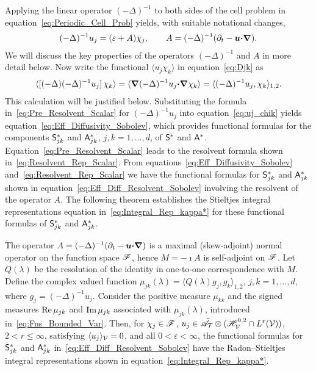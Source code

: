 \documentclass[amsa]{ipart}
\begin{document}
Applying the linear operator $(-\Delta)^{-1}$ to both sides of the cell
problem in equation~\eqref{eq:Periodic_Cell_Prob} yields, with
suitable notational changes,
%
\begin{align}\label{eq:Pre_Resolvent_Scalar}
  (-\Delta)^{-1}u_j=(\varepsilon+A)\chi_j,
  \qquad
  A=(-\Delta)^{-1}(\partial_t-\vecu \bcdot\bnabla).
\end{align}
%
We will discuss the key properties of the operators $(-\Delta)^{-1}$ and
$A$ in more detail below.  Now write the functional $\langle u_j\chi_k\rangle$ in 
equation~\eqref{eq:Djk} as~\cite{Pavliotis:PHD_Thesis}       
%
\begin{align}\label{eq:uj_chik}
  \langle[(-\Delta)(-\Delta)^{-1}u_j]\,\chi_k\rangle
       =\langle\bnabla(-\Delta)^{-1}u_j\bcdot\bnabla \chi_k\rangle
       =\langle(-\Delta)^{-1}u_j,\chi_k\rangle_{1,2}.
\end{align}
%
This calculation will be justified below. Substituting the  
formula in~\eqref{eq:Pre_Resolvent_Scalar} for $(-\Delta)^{-1}u_j$ 
into equation~\eqref{eq:uj_chik} yields
equation~\eqref{eq:Eff_Diffusivity_Sobolev}, which provides functional
formulas for the components
$\mathsf{S}^*_{jk}$ and $\mathsf{A}^*_{jk}$, $j,k=1,\ldots,d$, of $\mathsf{S}^*$ and $\mathsf{A}^*$.
Equation~\eqref{eq:Pre_Resolvent_Scalar}   
leads to the resolvent formula shown
in~\eqref{eq:Resolvent_Rep_Scalar}.  
From equations~\eqref{eq:Eff_Diffusivity_Sobolev}
and~\eqref{eq:Resolvent_Rep_Scalar} we have the functional formulas
for $\mathsf{S}^*_{jk}$ and $\mathsf{A}^*_{jk}$ shown in 
equation~\eqref{eq:Eff_Diff_Resolvent_Sobolev} involving the resolvent
of the operator $A$. The following theorem establishes the 
Stieltjes integral representations equation
in~\eqref{eq:Integral_Rep_kappa*} for these functional formulas of
$\mathsf{S}^*_{jk}$ and $\mathsf{A}^*_{jk}$.  



%
\begin{theorem}\label{thm:Integral_Reps}
  The operator $A=(-\Delta)^{-1}(\partial_t-\boldsymbol{u}\mbox{\boldmath${\cdot}$}\mbox{\boldmath${\nabla}$})$ is a maximal
  (skew-adjoint) normal operator on the function space $\mathscr{F}$, hence
  $M=-\imath A$ is self-adjoint on $\mathscr{F}$. Let $Q(\lambda)$ be the resolution of
  the identity in one-to-one correspondence with $M$. Define the
  complex valued function $\mu_{jk}(\lambda)=\langle Q(\lambda)g_j,g_k\rangle_{1,2}$,
  $j,k=1,\ldots,d$, where $g_j=(-\Delta)^{-1}u_j$. Consider the positive measure
  $\mu_{kk}$ and the signed measures $\mbox{Re}\,\mu_{jk}$ and $\mbox{Im}\,\mu_{jk}$
  associated with $\mu_{jk}(\lambda)$, introduced
  in~\eqref{eq:Fns_Bounded_Var}.  Then, for $\chi_j\in\mathscr{F}$,
  $u_j\in\tilde{\mathscr{A}}_{\mathcal{T}}\otimes (\mathscr{H}^{0,2}_{\mathcal{V}}\cap L^r(\mathcal{V}))$, $2<r\leq\infty$, satisfying
  $\langle u_j\rangle_{\mathcal{V}}=0$, and all $0<\varepsilon<\infty$, the functional formulas for $\mathsf{S}^*_{jk}$
  and $\mathsf{A}^*_{jk}$ in~\eqref{eq:Eff_Diff_Resolvent_Sobolev} have the
  Radon--Stieltjes integral representations shown in
  equation~\eqref{eq:Integral_Rep_kappa*}.     
% 
\end{theorem}
%
\end{document}
